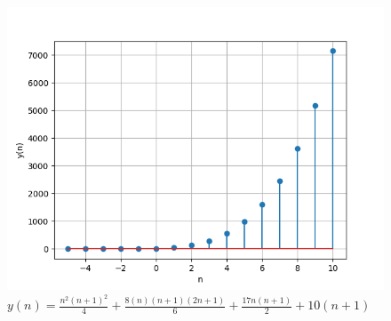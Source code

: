 \documentclass[journal,12pt,twocolumn]{IEEEtran}
\theoremstyle{remark}
\begin{document}
    \begin{figure}[!h] 
    \centering
    \includegraphics[width=\columnwidth]{figs/sumplot.png}
    \caption{$y(n)= \frac{n^2(n+1)^2}{4} + \frac{8(n)(n+1)(2n+1)}{6} + \frac{17n(n+1)}{2} + 10(n+1)$}
    \label{fig:Graph1_math.11.9.4.8}
    \end{figure}
\end{document}
